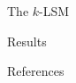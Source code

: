 \documentclass[final,hyperref={pdfpagelabels=true}]{beamer}
\newcommand{\klsm}{$k$-LSM\xspace}
\begin{document}
\begin{frame}
\begin{columns}[t]
\begin{column}{.45\textwidth}
\begin{block}{The \klsm}
\justifying
\end{block}

\begin{block}{Results}
\justifying
\end{block}

\begin{block}{References}
\printbibliography
\end{block}
\end{column}
\end{columns}

\end{frame}
\end{document}
